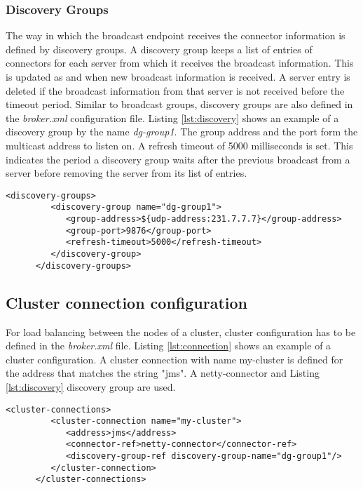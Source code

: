 \subsubsection{Discovery Groups}

The way in which the broadcast endpoint receives the connector information is defined by discovery groups. A discovery group keeps a list of entries of connectors for each server from which it receives the broadcast information. This is updated as and when new broadcast information is received. A server entry is deleted if the broadcast information from that server is not received before the timeout period. Similar to broadcast groups, discovery groups are also defined in the \textit{broker.xml} configuration file. Listing \ref{lst:discovery} shows an example of a discovery group by the name \textit{dg-group1}. The group address and the port form the multicast address to listen on. A refresh timeout of 5000 milliseconds is set. This indicates the period a discovery group waits after the previous broadcast from a server before removing the server from its list of entries.

\bigskip
\begin{lstlisting}[style=XmlInputStyle,caption=Discovery group example, label={lst:discovery}]
      <discovery-groups>
         <discovery-group name="dg-group1">
            <group-address>${udp-address:231.7.7.7}</group-address>
            <group-port>9876</group-port>
            <refresh-timeout>5000</refresh-timeout>
         </discovery-group>
      </discovery-groups>
\end{lstlisting}

\subsection{Cluster connection configuration}

For load balancing between the nodes of a cluster, cluster configuration has to be defined in the \textit{broker.xml} file. Listing \ref{lst:connection} shows an example of a cluster configuration. A cluster connection with name my-cluster is defined for the address that matches the string "jms". A netty-connector and Listing \ref{lst:discovery} discovery group are used.

\bigskip
\begin{lstlisting}[style=XmlInputStyle,caption=Cluster connection configuration example, label={lst:connection}]
      <cluster-connections>
         <cluster-connection name="my-cluster">
            <address>jms</address>
            <connector-ref>netty-connector</connector-ref>
            <discovery-group-ref discovery-group-name="dg-group1"/>
         </cluster-connection>
      </cluster-connections>
\end{lstlisting} 
